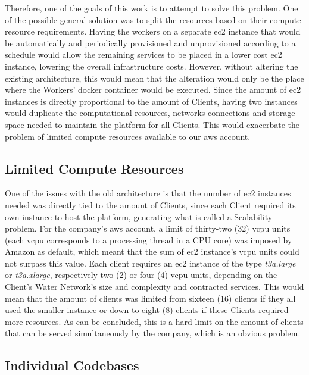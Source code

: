 Therefore, one of the goals of this work is to attempt to solve this problem. One of the possible general solution was to split the resources based on their compute resource requirements. Having the workers on a separate \gls{ec2} instance that would be automatically and periodically provisioned and unprovisioned according to a schedule would allow the remaining services to be placed in a lower cost \gls{ec2} instance, lowering the overall infrastructure costs. However, without altering the existing architecture, this would mean that the alteration would only be the place where the Workers' docker container would be executed. Since the amount of \gls{ec2} instances is directly proportional to the amount of Clients, having two instances would duplicate the computational resources, networks connections and storage space needed to maintain the platform for all Clients. This would exacerbate the problem of limited compute resources available to our \gls{aws} account.

\subsection{Limited Compute Resources}\label{methodology:ss:limited-compute-resources}

One of the issues with the old architecture is that the number of \gls{ec2} instances needed was directly tied to the amount of Clients, since each Client required its own instance to host the platform, generating what is called a Scalability problem. For the company's \gls{aws} account, a limit of thirty-two (32) \gls{vcpu} units (each \gls{vcpu} corresponds to a processing thread in a CPU core) was imposed by Amazon as default, which meant that the sum of \gls{ec2} instance's \gls{vcpu} units could not surpass this value. Each client requires an \gls{ec2} instance of the type \textit{t3a.large} or \textit{t3a.xlarge}, respectively two (2) or four (4) \gls{vcpu} units, depending on the Client's Water Network's size and complexity and contracted services. This would mean that the amount of clients was limited from sixteen (16) clients if they all used the smaller instance or down to eight (8) clients if these Clients required more resources. As can be concluded, this is a hard limit on the amount of clients that can be served simultaneously by the company, which is an obvious problem.

\subsection{Individual Codebases}\label{methodology:ss:individual-codebases}

